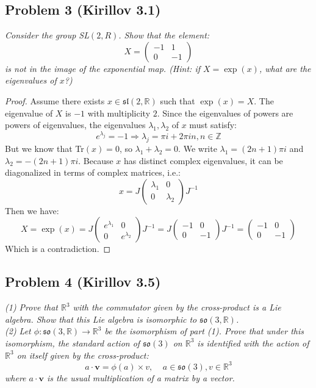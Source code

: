 \documentclass[12 pt]{article}
\newcommand{\R}{\mathbb{R}}
\newcommand{\Z}{\mathbb{Z}}
\newcommand{\fr}{\mathfrak}
\begin{document}
\subsection*{Problem 3 (Kirillov 3.1)}
\emph{Consider the group SL$(2,R)$. Show that the element:}
\[    X =  \left(  \begin{array} {cc} -1 & 1 \\ 0 & -1 \end{array} \right)  \]
\emph{is not in the image of the exponential map. (Hint: if $X = \exp(x)$, what are the eigenvalues of $x$?)}

\begin{proof}
Assume there exists $x \in \mathfrak{sl}(2, \R)$ such that $\exp(x) = X$. The eigenvalue of $X$ is $-1$ with multiplicity $2$. Since the eigenvalues of powers are powers of eigenvalues, the eigenvalues $\lambda_1, \lambda_2$ of $x$ must satisfy:
\[      e^{\lambda_j} = -1  \Rightarrow  \lambda_j = \pi i + 2\pi i n , n\in \Z   \]
But we know that Tr$(x) = 0$, so $\lambda_1 + \lambda_2 = 0$. We write $\lambda_1 = (2n+1) \pi i$ and $\lambda_2 = - (2n+1) \pi i$. Because $x$ has distinct complex eigenvalues, it can be diagonalized in terms of complex matrices, i.e.:
\[     x = J  \left(  \begin{array} {cc} \lambda_1 & 0 \\ 0 & \lambda_2 \end{array} \right) J^{-1}      \]
Then we have:
\[      X = \exp(x) = J    \left(  \begin{array} {cc} e^{\lambda_1} & 0 \\ 0 & e^{\lambda_2} \end{array} \right) J^{-1} =  J    \left(  \begin{array} {cc} -1 & 0 \\ 0 & -1 \end{array} \right) J^{-1} = \left(  \begin{array} {cc} -1 & 0 \\ 0 & -1 \end{array} \right)   \]
Which is a contradiction.

\end{proof}

\subsection*{Problem 4 (Kirillov 3.5)}
\emph{(1) Prove that $\R^3$ with the commutator given by the cross-product is a Lie algebra. Show that this Lie algebra is isomorphic to $\fr{so}(3,\R)$.
\\
(2) Let $\phi: \fr{so}(3,\R) \to \R^3$ be the isomorphism of part (1). Prove that under this isomorphism, the standard action of $\fr{so}(3)$ on $\R^3$ is identiﬁed with the action of $\R^3$ on itself given by the cross-product:
\[     a \cdot \mathbf{v} = \phi(a)\times v,\;\;\;\; a \in \fr{so}(3),v\in \R^3   \]
where $a \cdot \mathbf{v}$ is the usual multiplication of a matrix by a vector.}
\end{document}

